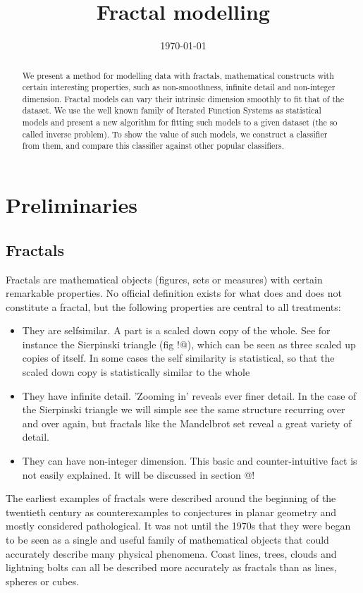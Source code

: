 \documentclass{article}
\title{Fractal modelling}
\date{\today}
\theoremstyle{definition}
\begin{document}
\maketitle

\begin{abstract}
We present a method for modelling data with fractals, mathematical constructs with certain interesting properties, such as non-smoothness, infinite detail and non-integer dimension. Fractal models can vary their intrinsic dimension smoothly to fit that of the dataset. We use the well known family of Iterated Function Systems as statistical models and present a new algorithm for fitting such models to a given dataset (the so called inverse problem). To show the value of such models, we construct a classifier from them, and compare this classifier against other popular classifiers.
\end{abstract}


\section{Preliminaries}
\subsection{Fractals}

Fractals are mathematical objects (figures, sets or measures) with certain remarkable properties. No official definition exists for what does and does not constitute a fractal, but the following properties are central to all treatments:
\begin{itemize}
  \item They are selfsimilar. A part is a scaled down copy of the whole. See for instance the Sierpinski triangle (fig !@), which can be seen as three scaled up copies of itself. In some cases the self similarity is statistical, so that the scaled down copy is statistically similar to the whole
  \item They have infinite detail. 'Zooming in' reveals ever finer detail. In the case of the Sierpinski triangle we will simple see the same structure recurring over and over again, but fractals like the Mandelbrot set reveal a great variety of detail.
  \item They can have non-integer dimension. This basic and counter-intuitive fact is not easily explained. It will be discussed in section @! 
\end{itemize}

The earliest examples of fractals were described around the beginning of the twentieth century as counterexamples to conjectures in planar geometry and mostly considered pathological. It was not until the 1970s that they were began to be seen as a single and useful family of mathematical objects that could accurately describe many physical phenomena. Coast lines, trees, clouds and lightning bolts can all be described more accurately as fractals than as lines, spheres or cubes.
\end{document}
